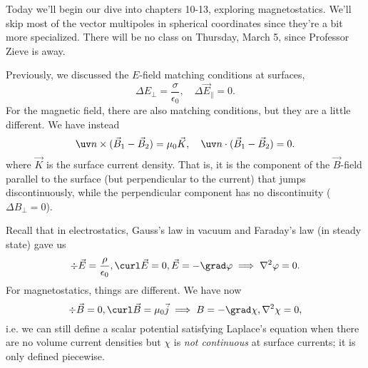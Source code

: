 Today we'll begin our dive into chapters 10-13, exploring magnetostatics. We'll skip most of the vector multipoles in spherical coordinates since they're a bit more specialized. There will be no class on Thursday, March 5, since Professor Zieve is away.

Previously, we discussed the $E$-field matching conditions at surfaces,
\begin{equation}
    \Delta E_\perp = \frac{\sigma}{\epsilon_0}, \quad \Delta \vec E_\parallel =0.
\end{equation}
For the magnetic field, there are also matching conditions, but they are a little different. We have instead
\begin{equation}
    \uv n \times (\vec B_1 - \vec B_2) = \mu_0 \vec K, \quad \uv n \cdot (\vec B_1 - \vec B_2) =0.
\end{equation}
where $\vec K$ is the surface current density. That is, it is the component of the $\vec B$-field parallel to the surface (but perpendicular to the current) that jumps discontinuously, while the perpendicular component has no discontinuity ($\Delta B_\perp =0$).

Recall that in electrostatics, Gauss's law in vacuum and Faraday's law (in steady state) gave us
\begin{equation}
    \div \vec E = \frac{\rho}{\epsilon_0}, \curl \vec E = 0, \vec E = -\grad \varphi \implies \nabla^2 \varphi=0.
\end{equation}
For magnetostatics, things are different. We have now
\begin{equation}
    \div \vec B =0 , \curl \vec B = \mu_0 \vec j \implies B = -\grad \chi, \nabla^2 \chi =0,
\end{equation}
i.e. we can still define a scalar potential satisfying Laplace's equation when there are no volume current densities but $\chi$ is \emph{not continuous} at surface currents; it is only defined piecewise.

